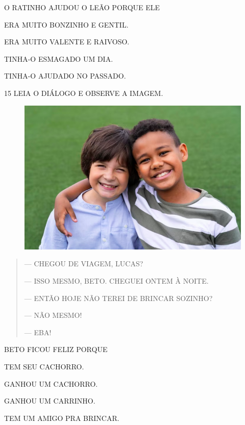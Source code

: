 O RATINHO AJUDOU O LEÃO PORQUE ELE

\begin{escolha}
\item ERA MUITO BONZINHO E GENTIL.

\item ERA MUITO VALENTE E RAIVOSO.

\item TINHA-O ESMAGADO UM DIA.

\item TINHA-O AJUDADO NO PASSADO.
\end{escolha}

\pagebreak
\num{15} LEIA O DIÁLOGO E OBSERVE A IMAGEM.

\begin{figure}[htpb]
\centering
\includegraphics[width=\textwidth]{media/image220b.png}
\end{figure}

\begin{quote}
— CHEGOU DE VIAGEM, LUCAS?

— ISSO MESMO, BETO. CHEGUEI ONTEM À NOITE.

— ENTÃO HOJE NÃO TEREI DE BRINCAR SOZINHO?

— NÃO MESMO!

— EBA!
\end{quote}

BETO FICOU FELIZ PORQUE

\begin{escolha}
\item TEM SEU CACHORRO.

\item GANHOU UM CACHORRO.

\item GANHOU UM CARRINHO.

\item TEM UM AMIGO PRA BRINCAR.
\end{escolha}

